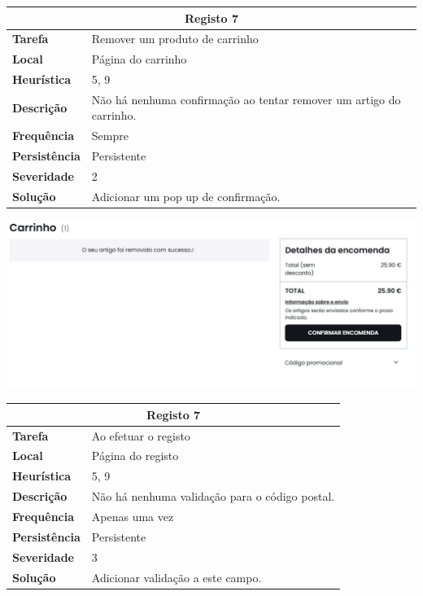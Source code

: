 \documentclass[a4paper,12pt]{article}
\begin{document}
\begin{center}
    \newpage
    \begin{table}[h!]
        \centering
        \begin{tabular}{|m{3cm}|m{12cm}|}
        \hline
        \multicolumn{2}{|c|}{\textbf{Registo 7}} \\ \hline
        \textbf{Tarefa}       & Remover um produto de carrinho \\ \hline
        \textbf{Local}        & Página do carrinho \\ \hline
        \textbf{Heurística}   & 5, 9  \\ \hline
        \textbf{Descrição}    & Não há nenhuma confirmação ao tentar remover um artigo do carrinho. \\ \hline
        \textbf{Frequência}   & Sempre \\ \hline
        \textbf{Persistência} & Persistente \\ \hline
        \textbf{Severidade}   & 2 \\ \hline
        \textbf{Solução}      & Adicionar um pop up de confirmação. \\ \hline
        \end{tabular}
    \end{table}
    
    \vspace{0.5cm}
    \includegraphics[width=\textwidth, keepaspectratio]{heuristics/07confirmacao_carrinho.png}

    \newpage
    \begin{table}[h!]
        \centering
        \begin{tabular}{|m{3cm}|m{12cm}|}
        \hline
        \multicolumn{2}{|c|}{\textbf{Registo 7}} \\ \hline
        \textbf{Tarefa}       & Ao efetuar o registo \\ \hline
        \textbf{Local}        & Página do registo \\ \hline
        \textbf{Heurística}   & 5, 9  \\ \hline
        \textbf{Descrição}    & Não há nenhuma validação para o código postal. \\ \hline
        \textbf{Frequência}   & Apenas uma vez \\ \hline
        \textbf{Persistência} & Persistente \\ \hline
        \textbf{Severidade}   & 3 \\ \hline
        \textbf{Solução}      & Adicionar validação a este campo. \\ \hline
        \end{tabular}
    \end{table}
    

\end{center}
\end{document}
